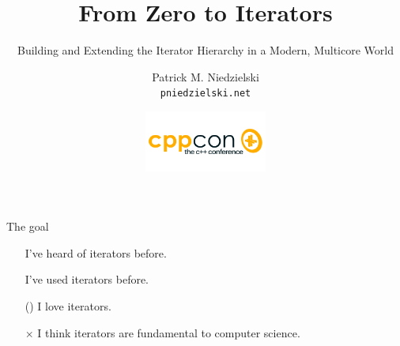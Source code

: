 \documentclass[aspectratio=169]{beamer}
\begin{document}



\title   {From Zero to Iterators}
\subtitle{Building and Extending the Iterator Hierarchy in a Modern,
          Multicore World}
\author  {Patrick M. Niedzielski \\ \texttt{pniedzielski.net}}
\date[CppCon 2016]    {\hfill\includegraphics[width=0.3\textwidth]{cppcon}}
\maketitle






\begin{frame}[standout]
\end{frame}


\begin{frame}{The goal}
  \begin{itemize}
  \item[\checkmark\hspace{0.3em}] I've heard of iterators before.
  \item[\checkmark\hspace{0.3em}] I've used iterators before.
  \item[(\checkmark)]             I love iterators.
  \item[$\times$\hspace{0.4em}]   I think iterators are fundamental to computer
    science. 
  \end{itemize}
\end{frame}
\end{document}
